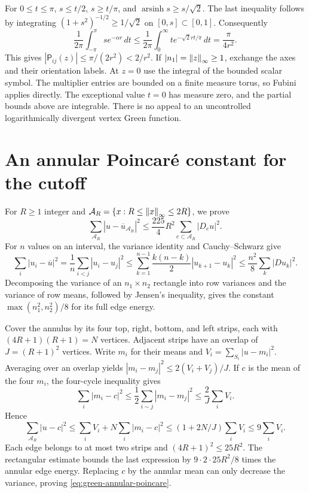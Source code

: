 For $0\le t\le\pi$,
$s\le t/2$, $s\ge t/\pi$, and
$\operatorname{arsinh}s\ge s/\sqrt2$.
The last inequality follows by integrating
$(1+s^2)^{-1/2}\ge1/\sqrt2$ on $[0,s]\subset[0,1]$.
Consequently
\[
 \frac1{2\pi}\int_{-\pi}^{\pi}s e^{-\alpha r}\,dt
 \le\frac1{2\pi}\int_0^\infty
      t e^{-\sqrt2 rt/\pi}\,dt
 =\frac{\pi}{4r^2}.
\]
This gives $|\mathsf P_{ij}(z)|\le\pi/(2r^2)<2/r^2$.
If $|n_1|=\left\lVert z\right\rVert_\infty\ge1$, exchange the axes and their orientation
labels.  At $z=0$ use the integral of the bounded scalar symbol.
The multiplier entries are bounded on a finite measure torus, so Fubini
applies directly.  The exceptional value $t=0$ has measure zero, and the
partial bounds above are integrable.  There is no appeal to an
uncontrolled logarithmically divergent vertex Green function.

\section{An annular Poincar\'e constant for the cutoff}
\label{app:green-annulus}

For $R\ge1$ integer and
$\mathcal A_R=\{x:R\le\left\lVert x\right\rVert_\infty\le2R\}$, we prove
\begin{equation}
 \sum_{\mathcal A_R}|u-\overline u_{\mathcal A_R}|^2
 \le\frac{225}{4}R^2\sum_{e\subset\mathcal A_R}|D_eu|^2.
 \label{eq:green-annular-poincare}
\end{equation}
For $n$ values on an interval, the variance identity and Cauchy--Schwarz
give
\[
 \sum_i|u_i-\overline u|^2
 =\frac1n\sum_{i<j}|u_i-u_j|^2
 \le\sum_{k=1}^{n-1}\frac{k(n-k)}2|u_{k+1}-u_k|^2
 \le\frac{n^2}{8}\sum_k|D u_k|^2.
\]
Decomposing the variance of an $n_1\times n_2$ rectangle into row
variances and the variance of row means, followed by Jensen's inequality,
gives the constant $\max(n_1^2,n_2^2)/8$ for its full edge energy.

Cover the annulus by its four top, right, bottom, and left strips, each
with $(4R+1)(R+1)=N$ vertices.  Adjacent strips have an overlap of
$J=(R+1)^2$ vertices.  Write $m_i$ for their means and
$V_i=\sum_{S_i}|u-m_i|^2$.  Averaging over an overlap yields
$|m_i-m_j|^2\le2(V_i+V_j)/J$.  If $c$ is the mean of the four $m_i$,
the four-cycle inequality gives
\[
 \sum_i|m_i-c|^2\le\frac12\sum_{i\sim j}|m_i-m_j|^2
 \le\frac2J\sum_i V_i.
\]
Hence
\[
 \sum_{\mathcal A_R}|u-c|^2
 \le\sum_iV_i+N\sum_i|m_i-c|^2
 \le(1+2N/J)\sum_iV_i\le9\sum_iV_i.
\]
Each edge belongs to at most two strips and $(4R+1)^2\le25R^2$.
The rectangular estimate bounds the last expression by
$9\cdot2\cdot25R^2/8$ times the annular edge energy.  Replacing $c$
by the annular mean can only decrease the variance, proving
\eqref{eq:green-annular-poincare}.

